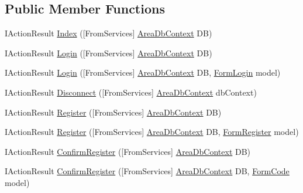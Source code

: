 \subsection*{Public Member Functions}
\begin{DoxyCompactItemize}
\item 
I\+Action\+Result \mbox{\hyperlink{classArea_1_1Controllers_1_1HomeController_a81852c6564831c3ba0cf7eddfc354997}{Index}} (\mbox{[}From\+Services\mbox{]} \mbox{\hyperlink{classArea_1_1DAT_1_1AreaDbContext}{Area\+Db\+Context}} DB)
\item 
I\+Action\+Result \mbox{\hyperlink{classArea_1_1Controllers_1_1HomeController_a5e4cf8ba8004592c197e31621233ff79}{Login}} (\mbox{[}From\+Services\mbox{]} \mbox{\hyperlink{classArea_1_1DAT_1_1AreaDbContext}{Area\+Db\+Context}} DB)
\item 
I\+Action\+Result \mbox{\hyperlink{classArea_1_1Controllers_1_1HomeController_a998f5002ebee5cf5ae63d206b816cd8c}{Login}} (\mbox{[}From\+Services\mbox{]} \mbox{\hyperlink{classArea_1_1DAT_1_1AreaDbContext}{Area\+Db\+Context}} DB, \mbox{\hyperlink{classArea_1_1Models_1_1FormLogin}{Form\+Login}} model)
\item 
I\+Action\+Result \mbox{\hyperlink{classArea_1_1Controllers_1_1HomeController_a99eb071c86613ccfe8003b803bceaafe}{Disconnect}} (\mbox{[}From\+Services\mbox{]} \mbox{\hyperlink{classArea_1_1DAT_1_1AreaDbContext}{Area\+Db\+Context}} db\+Context)
\item 
I\+Action\+Result \mbox{\hyperlink{classArea_1_1Controllers_1_1HomeController_a3ed060342c26dee6645dfc7bc0204f09}{Register}} (\mbox{[}From\+Services\mbox{]} \mbox{\hyperlink{classArea_1_1DAT_1_1AreaDbContext}{Area\+Db\+Context}} DB)
\item 
I\+Action\+Result \mbox{\hyperlink{classArea_1_1Controllers_1_1HomeController_a3062b0baba8394d263dca4bb3a19427a}{Register}} (\mbox{[}From\+Services\mbox{]} \mbox{\hyperlink{classArea_1_1DAT_1_1AreaDbContext}{Area\+Db\+Context}} DB, \mbox{\hyperlink{classArea_1_1Models_1_1FormRegister}{Form\+Register}} model)
\item 
I\+Action\+Result \mbox{\hyperlink{classArea_1_1Controllers_1_1HomeController_a510df0d8145d5ffcf8e89369b86e478c}{Confirm\+Register}} (\mbox{[}From\+Services\mbox{]} \mbox{\hyperlink{classArea_1_1DAT_1_1AreaDbContext}{Area\+Db\+Context}} DB)
\item 
I\+Action\+Result \mbox{\hyperlink{classArea_1_1Controllers_1_1HomeController_a5e8c1711863dc28e3ec574f69aab79c5}{Confirm\+Register}} (\mbox{[}From\+Services\mbox{]} \mbox{\hyperlink{classArea_1_1DAT_1_1AreaDbContext}{Area\+Db\+Context}} DB, \mbox{\hyperlink{classArea_1_1Models_1_1FormCode}{Form\+Code}} model)

\end{DoxyCompactItemize}
